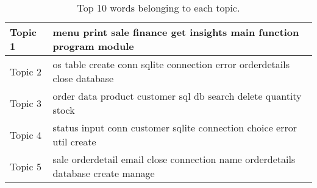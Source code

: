 \begin{table}[h]
    \footnotesize
    \captionsetup{justification=centering ,margin=1.5cm, labelfont=bf, font=footnotesize}
    \caption{Top 10 words belonging to each topic.}\label{tab:topic_distribution}
    \begin{tabular}{>{\raggedright}m{30pt}>{\raggedright\arraybackslash}m{282pt}}
        \toprule
        Topic 1
        & menu print sale finance get insights main function program module \\
        \midrule
        Topic 2
        & os table create conn sqlite connection error orderdetails close database\\
        \midrule
        Topic 3
        & order data product customer sql db search delete quantity stock\\
        \midrule
        Topic 4
        & status input conn customer sqlite connection choice error util create\\
        \midrule
        Topic 5
        & sale orderdetail email close connection name orderdetails database create manage\\
        \bottomrule
    \end{tabular}
\end{table}


